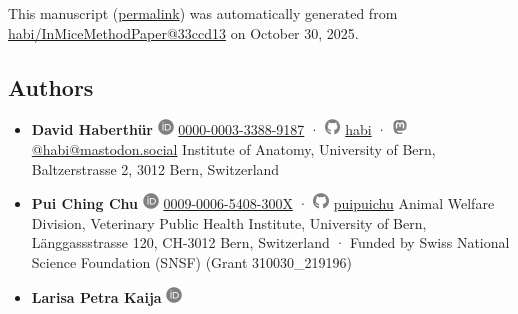 This manuscript
(\href{https://habi.github.io/InMiceMethodPaper/v/33ccd1317c08663cafa2fac99988986a8833efa8/}{permalink})
was automatically generated
from \href{https://github.com/habi/InMiceMethodPaper/tree/33ccd1317c08663cafa2fac99988986a8833efa8}{habi/InMiceMethodPaper@33ccd13}
on October 30, 2025.

\hypertarget{authors}{%
\subsection{Authors}\label{authors}}

\begin{itemize}
\item
  \textbf{David Haberthür}
  \includegraphics[width=0.16667in,height=0.16667in]{images/orcid.svg}
  \href{https://orcid.org/0000-0003-3388-9187}{0000-0003-3388-9187}
  · \includegraphics[width=0.16667in,height=0.16667in]{images/github.svg}
  \href{https://github.com/habi}{habi}
  · \includegraphics[width=0.16667in,height=0.16667in]{images/mastodon.svg}
  \href{https://mastodon.social/@habi}{@habi@mastodon.social}
  Institute of Anatomy, University of Bern, Baltzerstrasse 2, 3012 Bern, Switzerland
\item
  \textbf{Pui Ching Chu}
  \includegraphics[width=0.16667in,height=0.16667in]{images/orcid.svg}
  \href{https://orcid.org/0009-0006-5408-300X}{0009-0006-5408-300X}
  · \includegraphics[width=0.16667in,height=0.16667in]{images/github.svg}
  \href{https://github.com/puipuichu}{puipuichu}
  Animal Welfare Division, Veterinary Public Health Institute, University of Bern, Länggassstrasse 120, CH-3012 Bern, Switzerland
  · Funded by Swiss National Science Foundation (SNSF) (Grant 310030\_219196)
\item
  \textbf{Larisa Petra Kaija}
  \includegraphics[width=0.16667in,height=0.16667in]{images/orcid.svg}

\end{itemize}

